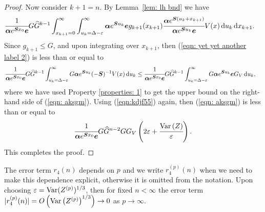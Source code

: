 \begin{proof}
	Now consider \(k+1=n\). By Lemma~\ref{lem: lh bnd} we have 
	\begin{align}
		&\cfrac{1}{\boldsymbol \alpha e^{\boldsymbol{S} x_0 }\boldsymbol e}G \widehat G^{k-1}
		\int_{x_{k+1}=0}^\infty \int_{u_k=\Delta-\varepsilon}^\infty \boldsymbol \alpha e^{\boldsymbol{S}u_k}\boldsymbol e g_{k+1}(x_{k+1}) \cfrac{\boldsymbol\alpha e^{\boldsymbol{S}(u_k+x_{k+1})}}{\boldsymbol \alpha e^{\boldsymbol{S}u_k}\boldsymbol e}V(x)\, \mathrm{d} u_k \, \mathrm{d} x_{k+1}. \label{eqn: yet yet another label 2}
		\end{align}
		{Since \(g_{k+1}\leq G\), and upon integrating over \(x_{k+1}\), then (\ref{eqn: yet yet another label 2}) is less than or equal to }
		\begin{align}
		& \cfrac{1}{\boldsymbol \alpha e^{\boldsymbol{S} x_0 }\boldsymbol e}G \widehat G^{k-1}  
		\int_{u_k=\Delta-\varepsilon}^\infty G \boldsymbol\alpha e^{\boldsymbol{S}u_k}(-\boldsymbol S)^{-1}V(x) \, \mathrm{d} u_k
		\leq \cfrac{1}{\boldsymbol \alpha e^{\boldsymbol{S} x_0 }\boldsymbol e}G \widehat G^{k-1}  
		\int_{u_k=\Delta-\varepsilon}^\infty G \boldsymbol \alpha e^{\boldsymbol S u_k} \boldsymbol e G_V \, \mathrm{d} u_k , \label{eqn: aksgm}
	\end{align}
	where we have used Property \ref{properties: 1} to get the upper bound on the right-hand side of (\ref{eqn: aksgm}). Using (\ref{eqn:kdjf55}) again, then (\ref{eqn: aksgm}) is less than or equal to
	\begin{align}
		\cfrac{1}{\boldsymbol \alpha e^{\boldsymbol{S} x_0 }\boldsymbol e}G\widehat G^{n-2}   G G_V\left(2\varepsilon + \cfrac{\mathrm{Var}\left(Z\right)}{\varepsilon}\right).
	\end{align}
	This completes the proof.  
\end{proof}

The error term \(r_4(n)\) depends on \(p\) and we write \(r_4^{(p)}(n)\) when we need to make this dependence explicit, otherwise it is omitted from the notation. Upon choosing \(\varepsilon = \mathrm{Var}(Z^{(p)})^{1/3}\), then for fixed \(n<\infty\) the error term \(|r_4^{(p)}(n)|= O\left(\mathrm{Var}\left(Z^{(p)}\right)^{1/3}\right)\to 0\) as \(p\to\infty\). 

